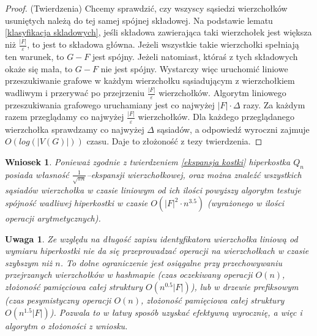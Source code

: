 \documentclass{pracamgr}
\newtheorem{remark}[theorem]{Uwaga}
\newtheorem{corollary}[theorem]{Wniosek}
\begin{document}
   \begin{proof}
    (Twierdzenia)\newline
    Chcemy sprawdzić, czy wszyscy sąsiedzi wierzchołków usuniętych należą do tej samej spójnej składowej. Na podstawie lematu \ref{klasyfikacja skladowych},
    jeśli składowa zawierająca taki wierzchołek jest większa niż $\frac{|F|}{\varepsilon}$, to jest to składowa główna.
    Jeżeli wszystkie takie wierzchołki spełniają ten warunek, to $G-F$ jest spójny.
    Jeżeli natomiast, któraś z tych składowych okaże się mała, to $G-F$ nie jest spójny.\newline
    Wystarczy więc uruchomić liniowe przeszukiwanie grafowe w każdym wierzchołku sąsiadującym z wierzchołkiem wadliwym i przerywać po przejrzeniu
    $\frac{|F|}{\varepsilon}$ wierzchołków.\newline
    Algorytm liniowego przeszukiwania grafowego uruchamiany jest co najwyżej $|F|\cdot\Delta$ razy.
    Za każdym razem przeglądamy co najwyżej $\frac{|F|}{\varepsilon}$ wierzchołków.
    Dla każdego przeglądanego wierzchołka sprawdzamy co najwyżej $\Delta$ sąsiadów, a odpowiedź wyroczni zajmuje $O(log(|V(G)|))$ czasu.
    Daje to złożoność z tezy twierdzenia.
   \end{proof}
   \begin{corollary}\label{ekspansywna spojnosc dla kostki}
    Ponieważ zgodnie z twierdzeniem \ref{ekspansja kostki} hiperkostka $Q_n$ posiada własność\newline
    $\frac{1}{\sqrt{\pi n}}$--ekspansji wierzchołkowej,
    oraz można znaleźć wszystkich sąsiadów wierzchołka w czasie liniowym od ich ilości powyższy algorytm testuje spójność wadliwej hiperkostki w czasie
    ${O(|F|^2\cdot n^{3.5})}$ (wyrażonego w ilości operacji arytmetycznych).
   \end{corollary}
   \begin{remark}\label{prawdziwa zlozoność ekspansywnej}
    Ze względu na długość zapisu identyfikatora wierzchołka liniową od wymiaru hiperkostki nie da się przeprowadzać operacji na wierzchołkach w czasie szybszym niż
    $n$. To dolne ograniczenie jest osiągalne przy przechowywaniu przejrzanych wierzchołków w hashmapie
    (czas oczekiwany operacji $O(n)$, złożoność pamięciowa całej struktury $O(n^{0.5}|F|)$),
    lub w drzewie prefiksowym (czas pesymistyczny operacji $O(n)$, złożoność pamięciowa całej struktury $O(n^{1.5}|F|)$).
    Pozwala to w łatwy sposób uzyskać efektywną wyrocznię, a więc i algorytm o złożoności z wniosku.
   \end{remark}
\end{document}
